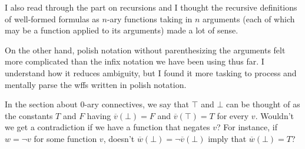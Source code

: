 \documentclass[english, 11pt, a4paper, twoside, openright, oldfontcommands]{amsart}
\begin{document}
\setlength{\headheight}{13.0pt}
\setlength{\footskip}{15.0pt}


I also  read through the part on recursions and
I thought the recursive definitions of well-formed formulas
as $n$-ary functions taking in $n$
arguments (each of which may be a function applied to its arguments)
made a lot of sense.

On the other hand, polish notation without parenthesizing
the arguments felt more complicated than the infix notation we
have been using thus far. I understand how it reduces ambiguity,
but I found it more tasking to process and mentally parse the wffs written in polish notation.


In the section about $0$-ary connectives,
we say that $\top$ and $\bot$ can be thought of as
the constants $T$ and $F$ having $\overline{v}(\bot) = F$ and $\overline{v}(\top) = T$
for every $v$.
Wouldn't we get a contradiction if we have a function that negates $v$?
For instance, if $w = \lnot v$ for some function $v$,
doesn't $\overline{w}(\bot) = \lnot \overline{v}(\bot)$ imply that
$\overline{w}(\bot) = T$?
\end{document}
